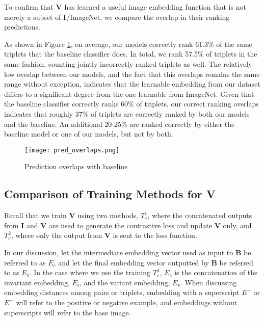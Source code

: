 To confirm that $\mathbf{V}$ has learned a useful image embedding function that is not merely a subset of $\mathbf{I}$/ImageNet, we compare the overlap in their ranking predictions.

As shown in Figure \ref{fig:overlaps}, on average, our models correctly rank 61.3\% of the same triplets that the baseline classifier does. In total, we rank 57.5\% of triplets in the same fashion, counting jointly incorrectly ranked triplets as well. The relatively low overlap between our models, and the fact that this overlaps remains the same range without exception, indicates that the learnable embedding from our dataset differs to a significant degree from the one learnable from ImageNet. Given that the baseline classifier correctly ranks 60\% of triplets, our correct ranking overlaps indicates that roughly 37\% of triplets are correctly ranked by both our models and the baseline. An additional 20-25\% are ranked correctly by either the baseline model or one of our models, but not by both.

\begin{figure}[!htbp]
	\centering
	\texttt{[image: pred\_overlaps.png]}
	\caption{Prediction overlaps with baseline}
	\label{fig:overlaps}
\end{figure}

\subsection{Comparison of Training Methods for V}
Recall that we train $\mathbf{V}$ using two methods, $T_c^1$, where the concatenated outputs from $\mathbf{I}$ and $\mathbf{V}$ are used to generate the contrastive loss and update $\mathbf{V}$ only, and $T_c^2$, where only the output from $\mathbf{V}$ is sent to the loss function.

In our discussion, let the intermediate embedding vector used as input to $\mathbf{B}$ be referred to as $E_c$ and let the final embedding vector outputted by $\mathbf{B}$ be referred to as $E_b$. In the case where we use the training $T_c^1$, $E_c$ is the concatenation of the invariant embedding, $E_i$, and the variant embedding, $E_v$. When discussing embedding distances among pairs or triplets, embedding with a superscript $E^+$ or $E^-$ will refer to the positive or negative example, and embeddings without superscripts will refer to the base image.

